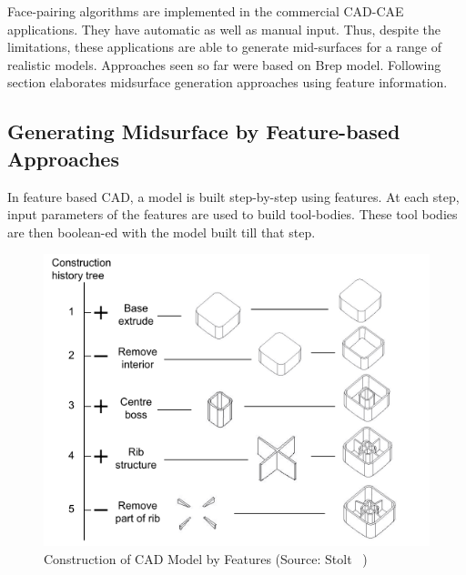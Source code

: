 Face-pairing algorithms are implemented in the commercial CAD-CAE applications. They have automatic as well as manual input. Thus, despite the limitations, these applications are able to generate mid-surfaces for a range of realistic models. Approaches seen so far were based on Brep model. Following section elaborates midsurface generation approaches using feature information.



\subsection{Generating Midsurface by Feature-based Approaches}

In feature based CAD, a model is built step-by-step using features. At each step,  input parameters of the features are used to build tool-bodies. These tool bodies are then boolean-ed with the model built till that step. 


	\begin{figure} [!h]
		\centering
		\includegraphics[width=0.75\linewidth]{images/stolttree}
		\caption{Construction of CAD Model by Features (Source: Stolt~\cite{Stolt2006} )}
		\label{fig:litsurvey:stolttree}
	\end{figure}

